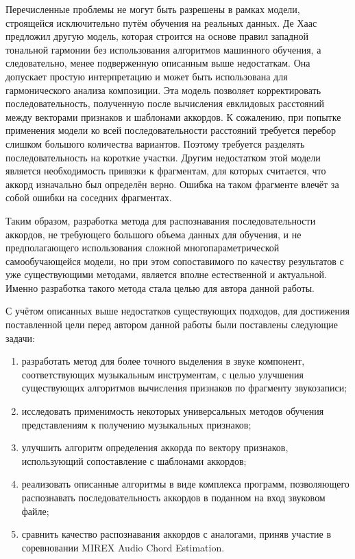 Перечисленные проблемы не могут быть разрешены в рамках модели, строящейся
исключительно путём обучения на реальных данных. Де Хаас предложил другую
модель, которая строится на основе правил западной тональной гармонии без
использования алгоритмов машинного обучения, а следовательно, менее подверженную
описанным выше недостаткам. Она допускает простую интерпретацию и может быть
использована для гармонического анализа композиции. Эта модель позволяет
корректировать последовательность, полученную после вычисления евклидовых
расстояний между векторами признаков и шаблонами аккордов. К сожалению, при
попытке применения модели ко всей последовательности расстояний требуется
перебор слишком большого количества вариантов. Поэтому требуется разделять
последовательность на короткие участки. Другим недостатком этой модели является
необходимость привязки к фрагментам, для которых считается, что аккорд
изначально был определён верно. Ошибка на таком фрагменте влечёт за собой ошибки
на соседних фрагментах.

Таким образом, разработка метода для распознавания последовательности аккордов,
не требующего большого объема данных для обучения, и не предполагающего
использования сложной многопараметрической самообучающейся модели, но при этом
сопоставимого по качеству результатов с уже существующими методами, является
вполне естественной и актуальной. Именно разработка такого метода стала целью
для автора данной работы.

С учётом описанных выше недостатков существующих подходов, для достижения
поставленной цели перед автором данной работы были поставлены следующие
задачи:

\begin{enumerate}
  \item разработать метод для более точного выделения в звуке компонент,
  соответствующих музыкальным инструментам, с целью улучшения существующих
  алгоритмов вычисления признаков по фрагменту звукозаписи;
  \item исследовать применимость некоторых универсальных методов обучения
  представлениям к получению музыкальных признаков;
  \item улучшить алгоритм определения аккорда по вектору признаков,
  использующий сопоставление с шаблонами аккордов;
  \item реализовать описанные алгоритмы в виде комплекса программ, позволяющего
  распознавать последовательность аккордов в поданном на вход звуковом файле;
  \item сравнить качество распознавания аккордов с аналогами, приняв участие в
  соревновании MIREX Audio Chord Estimation.
\end{enumerate}

